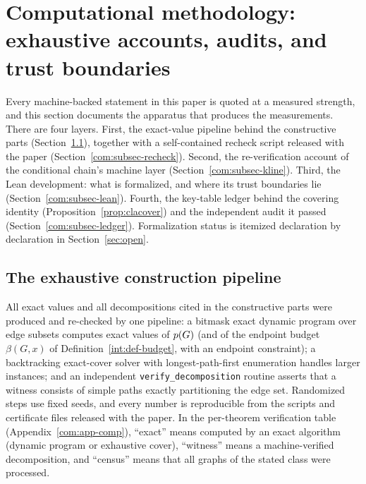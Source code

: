 
\section{Computational methodology: exhaustive accounts, audits, and trust
boundaries}\label{sec:computation}

Every machine-backed statement in this paper is quoted at a measured
strength, and this section documents the apparatus that produces the
measurements. There are four layers. First, the exact-value pipeline behind
the constructive parts (Section~\ref{com:subsec-pipeline}), together with a
self-contained recheck script released with the paper
(Section~\ref{com:subsec-recheck}). Second, the re-verification account of
the conditional chain's machine layer
(Section~\ref{com:subsec-kline}). Third, the Lean development: what is
formalized, and where its trust boundaries lie
(Section~\ref{com:subsec-lean}). Fourth, the key-table ledger behind the
covering identity (Proposition~\ref{prop:clacover}) and the independent
audit it passed (Section~\ref{com:subsec-ledger}). Formalization status is
itemized declaration by declaration in Section~\ref{sec:open}.

\subsection{The exhaustive construction pipeline}\label{com:subsec-pipeline}

All exact values and all decompositions cited in the constructive parts were
produced and re-checked by one pipeline: a bitmask exact dynamic program
over edge subsets computes exact values of $p(G)$ (and of the endpoint
budget $\beta(G,x)$ of Definition~\ref{int:def-budget}, with an endpoint
constraint); a backtracking exact-cover solver with longest-path-first
enumeration handles larger instances; and an independent
\texttt{verify\_decomposition} routine asserts that a witness consists of
simple paths exactly partitioning the edge set. Randomized steps use fixed
seeds, and every number is reproducible from the scripts and certificate
files released with the paper. In the per-theorem verification table
(Appendix~\ref{com:app-comp}), ``exact'' means computed by an exact algorithm
(dynamic program or exhaustive cover), ``witness'' means a machine-verified
decomposition, and ``census'' means that all graphs of the stated class were
processed.

